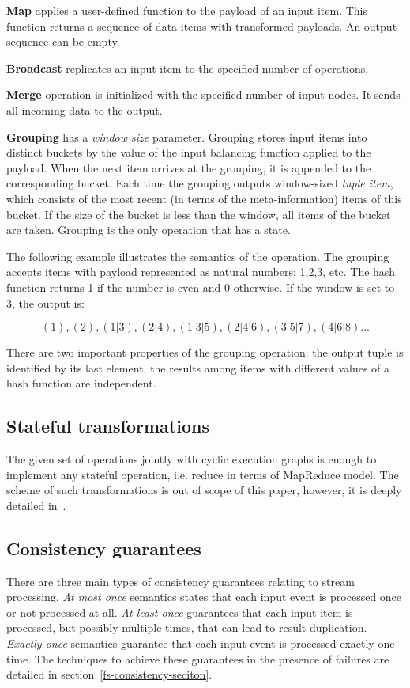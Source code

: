{\bf Map} applies a user-defined function to the payload of an input item. This function returns a sequence of data items with transformed payloads. An output sequence can be empty.

{\bf Broadcast} replicates an input item to the specified number of operations.

{\bf Merge} operation is initialized with the specified number of input nodes. It sends all incoming data to the output.

{\bf Grouping} has a {\it window size} parameter. Grouping stores input items into distinct buckets by the value of the input balancing function applied to the payload. When the next item arrives at the grouping, it is appended to the corresponding bucket. Each time the grouping outputs window-sized {\it tuple item}, which consists of the most recent (in terms of the meta-information) items of this bucket. If the size of the bucket is less than the window, all items of the bucket are taken. Grouping is the only operation that has a state.

The following example illustrates the semantics of the operation. The grouping accepts items with payload represented as natural numbers: 1,2,3, etc. The hash function returns 1 if the number is even and 0 otherwise. If the window is set to 3, the output is:

\[(1), (2), (1|3), (2|4), (1|3|5), (2|4|6), (3|5|7), (4|6|8)...\]

There are two important properties of the grouping operation: the output tuple is identified by its last element, the results among items with different values of a hash function are independent.

\subsection{Stateful transformations}
The given set of operations jointly with cyclic execution graphs is enough to implement any stateful operation, i.e. reduce in terms of MapReduce model. The scheme of such transformations is out of scope of this paper, however, it is deeply detailed in~\cite{we2018seim}.

\subsection{Consistency guarantees}
There are three main types of consistency guarantees relating to stream processing. {\it At most once} semantics states that each input event is processed once or not processed at all. {\it At least once} guarantees that each input item is processed, but possibly multiple times, that can lead to result duplication. {\it Exactly once} semantics guarantee that each input event is processed exactly one time. The techniques to achieve these guarantees in the presence of failures are detailed in section~\ref{fs-consistency-seciton}.

